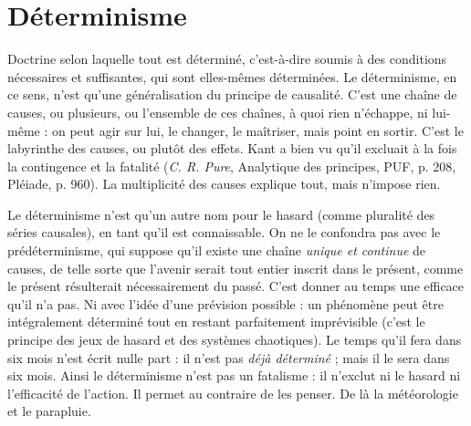 
\section{Déterminisme}
Doctrine selon laquelle tout est déterminé, c’est-à-dire
soumis à des conditions nécessaires et suffisantes, qui
sont elles-mêmes déterminées. Le déterminisme, en ce sens, n’est qu’une généralisation
du principe de causalité. C’est une chaîne de causes, ou plusieurs, ou
l’ensemble de ces chaînes, à quoi rien n’échappe, ni lui-même : on peut agir sur
lui, le changer, le maîtriser, mais point en sortir. C’est le labyrinthe des causes,
ou plutôt des effets. Kant a bien vu qu’il excluait à la fois la contingence et la
fatalité ({\it C. R. Pure}, Analytique des principes, PUF, p. 208, Pléiade, p. 960). La
multiplicité des causes explique tout, mais n’impose rien.

Le déterminisme n’est qu’un autre nom pour le hasard (comme pluralité
des séries causales), en tant qu’il est connaissable. On ne le confondra pas avec
le prédéterminisme, qui suppose qu’il existe une chaîne {\it unique et continue} de
causes, de telle sorte que l’avenir serait tout entier inscrit dans le présent,
comme le présent résulterait nécessairement du passé. C’est donner au temps
une efficace qu’il n’a pas. Ni avec l’idée d’une prévision possible : un phénomène
peut être intégralement déterminé tout en restant parfaitement imprévisible
(c’est le principe des jeux de hasard et des systèmes chaotiques). Le temps
qu'il fera dans six mois n’est écrit nulle part : il n’est pas {\it déjà déterminé} ; mais
il le sera dans six mois. Ainsi le déterminisme n’est pas un fatalisme : il n’exclut
ni le hasard ni l'efficacité de l’action. Il permet au contraire de les penser. De là
la météorologie et le parapluie.

